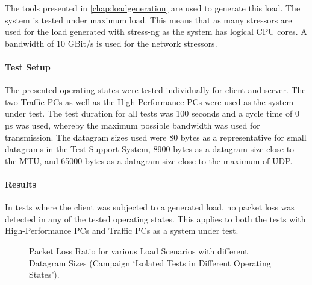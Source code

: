 The tools presented in \ref{chap:loadgeneration} are used to generate this load. The system is tested under maximum load. This means that as many stressors are used for the load generated with stress-ng as the system has logical CPU cores. A bandwidth of 10 GBit/s is used for the network stressors.

\paragraph{Test Setup}
The presented operating states were tested individually for client and server. The two Traffic PCs as well as the High-Performance PCs were used as the system under test. The test duration for all tests was 100 seconds and a cycle time of 0 µs was used, whereby the maximum possible bandwidth was used for transmission. The datagram sizes used were 80 bytes as a representative for small datagrams in the Test Support System, 8900 bytes as a datagram size close to the MTU, and 65000 bytes as a datagram size close to the maximum of UDP.

\paragraph{Results}
In tests where the client was subjected to a generated load, no packet loss was detected in any of the tested operating states. This applies to both the tests with High-Performance PCs and Traffic PCs as a system under test.

\begin{figure}[h!]
  \centering
  \caption{Packet Loss Ratio for various Load Scenarios with different Datagram Sizes (Campaign `Isolated Tests in Different Operating States').}
  \label{fig:resuc1}
\end{figure}

